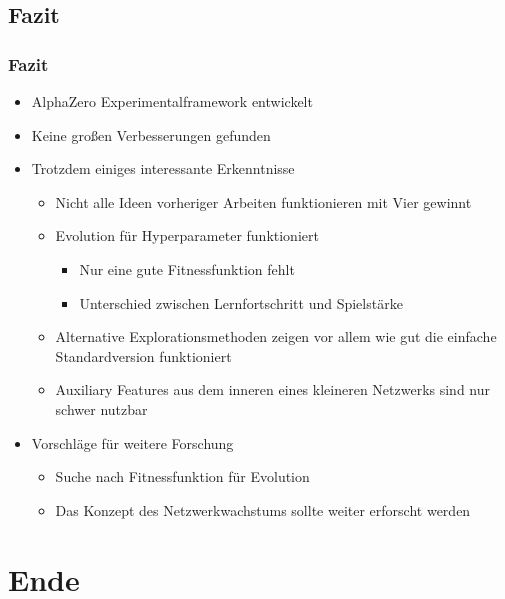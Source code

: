 \subsection{Fazit}



\begin{frame}
 \frametitle{Fazit}
  


\begin{itemize}
  \item \pause AlphaZero Experimentalframework entwickelt
  \item \pause Keine großen Verbesserungen gefunden
  \item \pause Trotzdem einiges interessante Erkenntnisse
\begin{itemize}
  \item \pause Nicht alle Ideen vorheriger Arbeiten funktionieren mit Vier gewinnt
  \item \pause Evolution für Hyperparameter funktioniert
\begin{itemize}
  \item \pause Nur eine gute Fitnessfunktion fehlt
  \item \pause Unterschied zwischen Lernfortschritt und Spielstärke
\end{itemize}
  \item \pause Alternative Explorationsmethoden zeigen vor allem wie gut die einfache Standardversion funktioniert
  \item \pause Auxiliary Features aus dem inneren eines kleineren Netzwerks sind nur schwer nutzbar
\end{itemize}
  \item \pause Vorschläge für weitere Forschung
\begin{itemize}
  \item \pause Suche nach Fitnessfunktion für Evolution
  \item \pause Das Konzept des Netzwerkwachstums sollte weiter erforscht werden
\end{itemize}
\end{itemize}


  
\end{frame}

\section{Ende}




